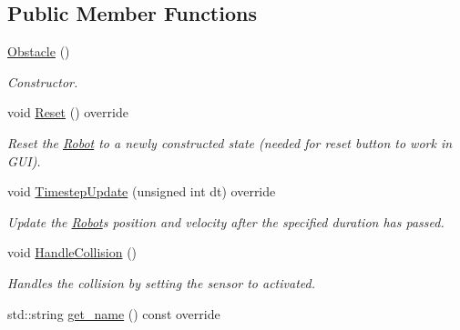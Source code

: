 \subsection*{Public Member Functions}
\begin{DoxyCompactItemize}
\item 
\hyperlink{classObstacle_a8f734072321fa06a7b7dae2d5f50f352}{Obstacle} ()\hypertarget{classObstacle_a8f734072321fa06a7b7dae2d5f50f352}{}\label{classObstacle_a8f734072321fa06a7b7dae2d5f50f352}

\begin{DoxyCompactList}\small\item\em Constructor. \end{DoxyCompactList}\item 
void \hyperlink{classObstacle_a5fb8be1be47445fc8286477312b5df62}{Reset} () override\hypertarget{classObstacle_a5fb8be1be47445fc8286477312b5df62}{}\label{classObstacle_a5fb8be1be47445fc8286477312b5df62}

\begin{DoxyCompactList}\small\item\em Reset the \hyperlink{classRobot}{Robot} to a newly constructed state (needed for reset button to work in G\+UI). \end{DoxyCompactList}\item 
void \hyperlink{classObstacle_adda549c77a5a67aa5423cb0f84b986df}{Timestep\+Update} (unsigned int dt) override
\begin{DoxyCompactList}\small\item\em Update the \hyperlink{classRobot}{Robot}\textquotesingle{}s position and velocity after the specified duration has passed. \end{DoxyCompactList}\item 
void \hyperlink{classObstacle_ad9daaf35d2ff7514ed205793a01892e3}{Handle\+Collision} ()\hypertarget{classObstacle_ad9daaf35d2ff7514ed205793a01892e3}{}\label{classObstacle_ad9daaf35d2ff7514ed205793a01892e3}

\begin{DoxyCompactList}\small\item\em Handles the collision by setting the sensor to activated. \end{DoxyCompactList}\item 
std\+::string \hyperlink{classObstacle_a4642d3f61b6e74fd5a9c91bb263dfe18}{get\+\_\+name} () const override\hypertarget{classObstacle_a4642d3f61b6e74fd5a9c91bb263dfe18}{}\label{classObstacle_a4642d3f61b6e74fd5a9c91bb263dfe18}


\end{DoxyCompactItemize}
